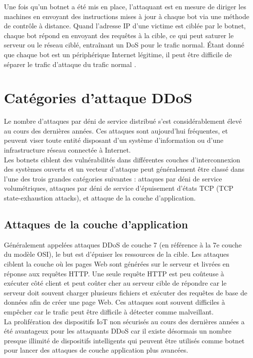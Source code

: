 	Une fois qu'un botnet a été mis en place, l'attaquant est en mesure de diriger les machines en envoyant des instructions mises à jour à chaque bot via une méthode de contrôle à distance. Quand l’adresse IP d'une victime est ciblée par le botnet, chaque bot répond en envoyant des requêtes à la cible, ce qui peut saturer le serveur ou le réseau ciblé, entraînant un DoS pour le trafic normal. Étant donné que chaque bot est un périphérique Internet légitime, il peut être difficile de séparer le trafic d'attaque du trafic normal \cite{cloudflareddos}.


	\section{Catégories d’attaque DDoS}	
	Le nombre d’attaques par déni de service distribué s’est considérablement élevé au cours des dernières années. Ces attaques sont aujourd’hui fréquentes, et peuvent viser toute entité disposant d’un système d’information ou d’une infrastructure réseau connectée à Internet.\\
	
	Les botnets ciblent des vulnérabilités dans différentes couches d’interconnexion des systèmes ouverts et un vecteur d’attaque peut généralement être classé dans l’une des trois grandes catégories suivantes \cite{netscoutddos} : attaques par déni de service volumétriques, attaques par déni de service d’épuisement d’états TCP (TCP state-exhaustion attacks), et attaque de la couche d’application.

	\subsection{Attaques de la couche d’application}
	Généralement appelées attaques DDoS de couche 7 (en référence à la 7e couche du modèle OSI), le but est d'épuiser les ressources de la cible. Les attaques ciblent la couche où les pages Web sont générées sur le serveur et livrées en réponse aux requêtes HTTP. Une seule requête HTTP est peu coûteuse à exécuter côté client et peut coûter cher au serveur cible de répondre car le serveur doit souvent charger plusieurs fichiers et exécuter des requêtes de base de données afin de créer une page Web. Ces attaques sont souvent difficiles à empêcher car le trafic peut être difficile à détecter comme malveillant.\\
	La prolifération des dispositifs IoT non sécurisés au cours des dernières années a été avantageux pour les attaquants DDoS car il existe désormais un nombre presque illimité de dispositifs intelligents qui peuvent être utilisés comme botnet pour lancer des attaques de couche application plus avancées.

